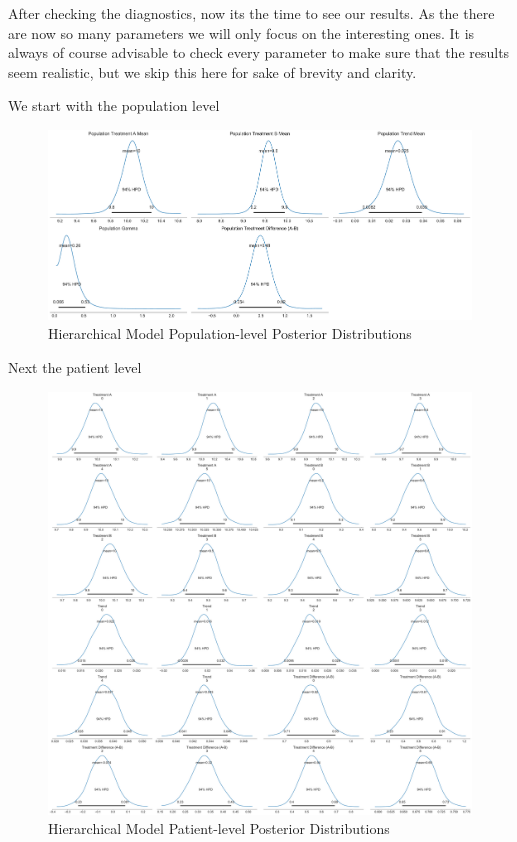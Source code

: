 \documentclass[12pt,a4paper,leqno]{report}
\theoremstyle{plain}
\theoremstyle{definition}
\theoremstyle{remark}
\begin{document}
After checking the diagnostics, now its the time to see our results. As the there are
now so many parameters we will only focus on the interesting ones. It is always of
course advisable to check every parameter to make sure that the results seem realistic,
but we skip this here for sake of brevity and clarity.

We start with the population level

\bigskip
\begin{figure}[H]
    \caption{Hierarchical Model Population-level Posterior Distributions}
    \label{hierarchicalmodelpopulationposteriors}
    \bigskip
    \includegraphics[width=\textwidth,height=\textheight,keepaspectratio]{hierarchical_model_population_level_posteriors.pdf}
\end{figure}
\bigskip

Next the patient level

\bigskip
\begin{figure}[H]
    \caption{Hierarchical Model Patient-level Posterior Distributions}
    \label{hierarchicalmodelpatientposteriors}
    \bigskip
    \includegraphics[width=\textwidth,height=\textheight,keepaspectratio]{hierarchical_model_patient_level_posteriors.pdf}
\end{figure}
\bigskip
\end{document}
